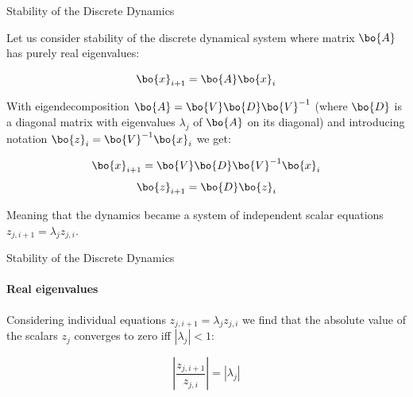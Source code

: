 \documentclass{beamer}
\begin{document}
\begin{frame}{Stability of the Discrete Dynamics}
	\begin{flushleft}
		
		Let us consider stability of the discrete dynamical system where matrix $\bo{A}$ has purely real eigenvalues:
		
		\begin{equation}
			\bo{x}_{i+1} = \bo{A}\bo{x}_i
		\end{equation}		
		
		With eigendecomposition $\bo{A} = \bo{V} \bo{D} \bo{V}^{-1}$ (where $\bo{D}$ is a diagonal matrix with eigenvalues $\lambda_j$ of $\bo{A}$ on its diagonal)  and introducing notation $\bo{z}_i = \bo{V}^{-1}\bo{x}_i$ we get:
		
		\begin{equation}
			\bo{x}_{i+1} = \bo{V} \bo{D} \bo{V}^{-1}\bo{x}_i
		\end{equation}
		\begin{equation}
			\bo{z}_{i+1} =  \bo{D} \bo{z}_i
		\end{equation}
		
		Meaning that the dynamics became a system of independent scalar equations $z_{j, i+1} =  \lambda_j z_{j, i}$. 
		
		
	\end{flushleft}
\end{frame}




\begin{frame}{Stability of the Discrete Dynamics}
	\framesubtitle{Real eigenvalues}
	\begin{flushleft}
		
		Considering individual equations $z_{j, i+1} =  \lambda_j z_{j, i}$ we find that the absolute value of the scalars $z_{j}$ converges to zero iff $|\lambda_j| < 1$:
		
		\begin{equation}
			\left| \frac{z_{j, i+1}}{z_{j, i}} \right | =   | \lambda_j |
		\end{equation}
		 
		
	\end{flushleft}
\end{frame}
\end{document}
